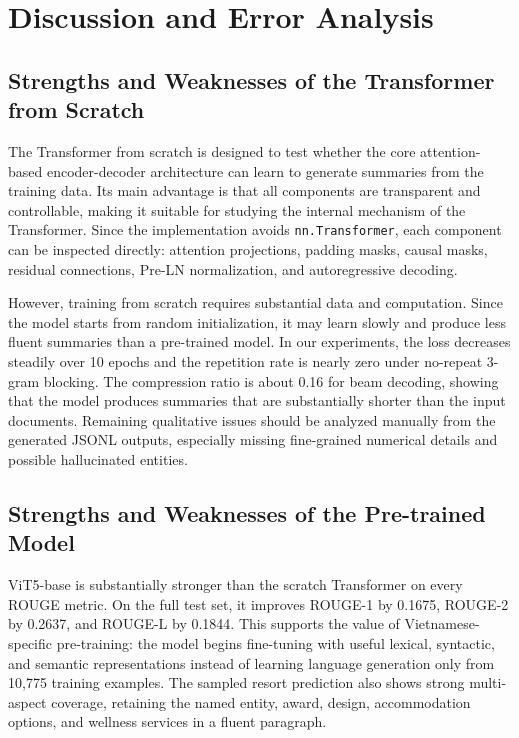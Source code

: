 \documentclass[conference]{IEEEtran}
\begin{document}
\section{Discussion and Error Analysis}

\subsection{Strengths and Weaknesses of the Transformer from Scratch}
The Transformer from scratch is designed to test whether the core attention-based encoder-decoder architecture can learn to generate summaries from the training data. Its main advantage is that all components are transparent and controllable, making it suitable for studying the internal mechanism of the Transformer. Since the implementation avoids \texttt{nn.Transformer}, each component can be inspected directly: attention projections, padding masks, causal masks, residual connections, Pre-LN normalization, and autoregressive decoding.

However, training from scratch requires substantial data and computation. Since the model starts from random initialization, it may learn slowly and produce less fluent summaries than a pre-trained model. In our experiments, the loss decreases steadily over 10 epochs and the repetition rate is nearly zero under no-repeat 3-gram blocking. The compression ratio is about 0.16 for beam decoding, showing that the model produces summaries that are substantially shorter than the input documents. Remaining qualitative issues should be analyzed manually from the generated JSONL outputs, especially missing fine-grained numerical details and possible hallucinated entities.

\subsection{Strengths and Weaknesses of the Pre-trained Model}
ViT5-base is substantially stronger than the scratch Transformer on every ROUGE metric. On the full test set, it improves ROUGE-1 by 0.1675, ROUGE-2 by 0.2637, and ROUGE-L by 0.1844. This supports the value of Vietnamese-specific pre-training: the model begins fine-tuning with useful lexical, syntactic, and semantic representations instead of learning language generation only from 10,775 training examples. The sampled resort prediction also shows strong multi-aspect coverage, retaining the named entity, award, design, accommodation options, and wellness services in a fluent paragraph.
\end{document}
